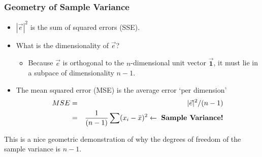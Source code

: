 \documentclass{beamer}
\begin{document}
\begin{frame}[shrink]
  \frametitle{Geometry of Sample Variance}

\begin{itemize}

\item $|\vec{e}|^2$ is the sum of squared errors (SSE).

\item What is the dimensionality of $\vec{e}$?  

\begin{itemize}
	\item Because $\vec{e}$ is orthogonal to the $n$-dimensional unit vector $\vec{\mathbf{1}}$, it must lie in a subpace of dimensionality $n-1$.
\end{itemize}

\item The mean squared error (MSE) is the average error `per dimension'
\begin{eqnarray*}
MSE & = & |\vec{e}|^2/(n-1) \\
     & =& \frac{1}{(n-1)} \sum (x_i - \bar{x})^2 \leftarrow \ \mbox{\textbf{Sample Variance!}}
\end{eqnarray*}

\end{itemize}
\begin{center}
\end{center}
This is a nice geometric demonstration of why the degrees of freedom of the sample variance is $n-1$.


\end{frame}
\end{document}
